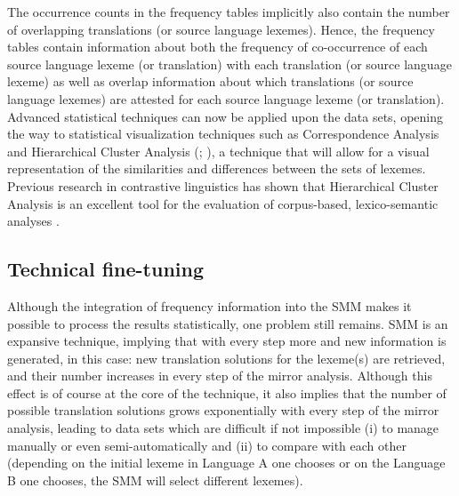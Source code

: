 The occurrence counts in the frequency tables implicitly also contain the number of overlapping translations (or source language lexemes). Hence, the frequency tables contain information about both the frequency of co-occurrence of each source language lexeme (or translation) with each translation (or source language lexeme) as well as overlap information about which translations (or source language lexemes) are attested for each source language lexeme (or translation). Advanced statistical techniques can now be applied upon the data sets, opening the way to statistical visualization techniques such as Correspondence Analysis \citep{greenacre_correspondence_2007,lebart_exploring_1998} and Hierarchical Cluster Analysis (\citealp[138]{baayen_analyzing_2008}; \citealp[336]{gries_statistics_2013}), a technique that will allow for a visual representation of the similarities and differences between the sets of lexemes. Previous research in contrastive linguistics has shown that Hierarchical Cluster Analysis is an excellent tool for the evaluation of corpus-based, lexico-semantic analyses \citep{evans_behavioral_2009,libben_behavioral_2012,glynn_cluster_2014}.


\subsection{Technical fine-tuning}
\label{sec:3.5.3}
Although the integration of frequency information into the SMM makes it possible to process the results statistically, one problem still remains. SMM is an expansive technique, implying that with every step more and new information is generated, in this case: new translation solutions for the lexeme(s) are retrieved, and their number increases in every step of the mirror analysis. Although this effect is of course at the core of the technique, it also implies that the number of possible translation solutions grows exponentially with every step of the mirror analysis, leading to data sets which are difficult if not impossible (i) to manage manually or even semi-automatically and (ii) to compare with each other (depending on the initial lexeme in Language A one chooses or on the Language B one chooses, the SMM will select different lexemes).


